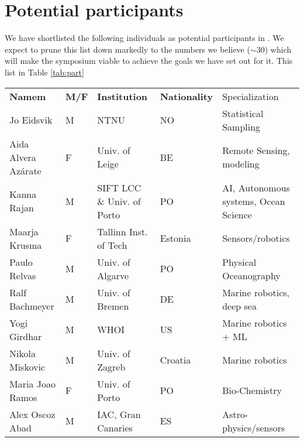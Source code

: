 \section{Potential participants}
\label{sec:part}

We have shortlisted the following individuals as potential participants
in \sympe. We expect to prune this list down markedly to the numbers we
believe ($\sim 30$) which will make the symposium viable to achieve the
goals we have set out for it. This list in Table \ref{tab:part}

\begin{table}[]
  \footnotesize{
\begin{tabular}{|p{3cm}|p{0.5cm}|p{3.5cm}|p{1cm}|p{4cm}|}
  \rowcolor{Gray}
  \bfseries Namem& \bfseries M/F&\bfseries Institution & \bfseries Nationality& Specialization\\
Jo Eidsvik               & M   & NTNU                                  & NO       & Statistical Sampling                            \\
\hline
Aida Alvera Az\'{a}rate    & F   & Univ. of Leige                        & BE       & Remote Sensing, modeling                        \\
\hline
Kanna Rajan              & M   & SIFT LCC \& Univ. of Porto            & PO       & AI, Autonomous systems, Ocean Science           \\
 \hline
Maarja Krusma            & F   & Tallinn Inst. of Tech                 & Estonia  & Sensors/robotics                                \\
  \hline
Paulo Relvas             & M   & Univ. of Algarve                      & PO       & Physical Oceanography                           \\
\hline
Ralf Bachmeyer           & M   & Univ. of Bremen                       & DE       & Marine robotics, deep sea                       \\
\hline
Yogi Girdhar             & M   & WHOI                                  & US       & Marine robotics + ML                            \\
\hline
Nikola Miskovic          & M   & Univ. of Zagreb                       & Croatia  & Marine robotics                                 \\
\hline
Maria Joao Ramos         & F   & Univ. of Porto                        & PO       & Bio-Chemistry                                   \\
\hline
Alex Oscoz Abad          & M   & IAC, Gran Canaries                    & ES       & Astro-physics/sensors                           \\

\end{tabular}}
\end{table}

